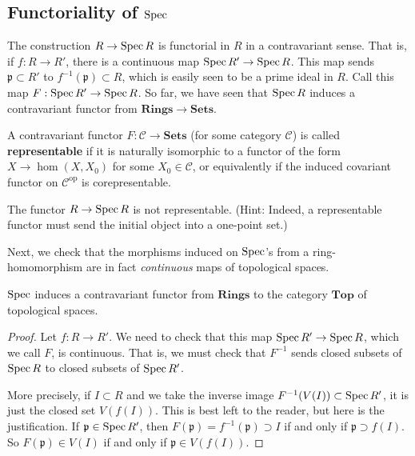 \subsection{Functoriality of $\operatorname{Spec}$}
 The construction $R \to \operatorname{Spec} R$ is functorial in $R$ in a
contravariant sense. That is, if $f: R \to R'$, there is a
continuous map $\operatorname{Spec}
R' \to \operatorname{Spec} R$. This map sends $\mathfrak{p} \subset R'$ to
$f^{-1}(\mathfrak{p}) \subset R$, which is easily seen to be a
prime ideal
in $R$. Call this map $F: \operatorname{Spec} R' \to \operatorname{Spec} R$. So far, we have
seen that
$\operatorname{Spec} R$ induces a contravariant functor from $\mathbf{Rings}
\to \mathbf{Sets}$.

\begin{exercise} 
A contravariant functor $F: \mathcal{C} \to \mathbf{Sets}$ (for
some category
$\mathcal{C}$) is called \textbf{representable} if it is
naturally isomorphic
to a functor of the form $X \to \hom(X, X_0)$ for some $X_0 \in
\mathcal{C}$,
or equivalently if the induced covariant functor on
$\mathcal{C}^{\mathrm{op}}$ is corepresentable. 

The functor $R \to \operatorname{Spec} R $ is not representable. (Hint:
Indeed, a representable
functor must send the initial object into a one-point set.)
\end{exercise} 

Next, we check that the morphisms induced on $\operatorname{Spec}$'s from a
ring-homomorphism are in fact \emph{continuous} maps of
topological spaces.

\begin{proposition} 
$\operatorname{Spec} $ induces a contravariant functor from $\mathbf{Rings}$
to the category
$\mathbf{Top}$ of topological spaces.
\end{proposition} 
\begin{proof} Let $f : R \to R'$. 
We need to check that this map $ \operatorname{Spec} R' \to \operatorname{Spec} R$, which we
call $F$, is
continuous.
That is, we must check that $F^{-1}$ sends closed
subsets of $\operatorname{Spec} R$ to closed subsets of $\operatorname{Spec} R'$.  

More precisely, if $I \subset
R$ and we take the inverse image $F^{-1}(V(I)) \subset \operatorname{Spec}
R'$, it is just
the closed set $V(f(I))$. This is best left to the reader, but
here is the justification. If $\mathfrak{p} \in \operatorname{Spec} R'$, then
$F(\mathfrak{p}) = f^{-1}(\mathfrak{p})
\supset I$ if and only if $\mathfrak{p} \supset f(I)$. So
$F(\mathfrak{p}) \in
V(I)$ if and only if $\mathfrak{p} \in V(f(I))$.

\end{proof} 



